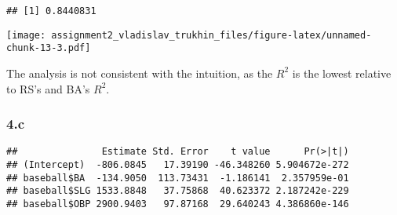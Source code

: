 \documentclass[
]{article}
\newenvironment{Shaded}{\begin{snugshade}}{\end{snugshade}}
\newcommand{\CommentTok}[1]{\textcolor[rgb]{0.56,0.35,0.01}{\textit{#1}}}
\newcommand{\FunctionTok}[1]{\textcolor[rgb]{0.00,0.00,0.00}{#1}}
\newcommand{\NormalTok}[1]{#1}
\newcommand{\OtherTok}[1]{\textcolor[rgb]{0.56,0.35,0.01}{#1}}
\newcommand{\SpecialCharTok}[1]{\textcolor[rgb]{0.00,0.00,0.00}{#1}}
\begin{document}
\begin{verbatim}
## [1] 0.8440831
\end{verbatim}

\begin{Shaded}
\end{Shaded}

\texttt{[image: assignment2\_vladislav\_trukhin\_files/figure-latex/unnamed-chunk-13-3.pdf]}

The analysis is not consistent with the intuition, as the \(R^2\) is the
lowest relative to RS's and BA's \(R^2\).

\hypertarget{c-3}{%
\subsubsection{4.c}\label{c-3}}

\begin{Shaded}
\end{Shaded}

\begin{verbatim}
##               Estimate Std. Error    t value      Pr(>|t|)
## (Intercept)  -806.0845   17.39190 -46.348260 5.904672e-272
## baseball$BA  -134.9050  113.73431  -1.186141  2.357959e-01
## baseball$SLG 1533.8848   37.75868  40.623372 2.187242e-229
## baseball$OBP 2900.9403   97.87168  29.640243 4.386860e-146
\end{verbatim}

\begin{Shaded}
\end{Shaded}
\end{document}
